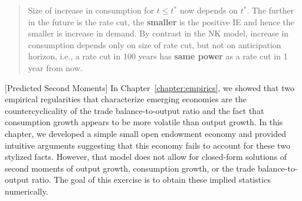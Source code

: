 \begin{exercise}
\begin{quote}
\begin{enumerate}
Size of increase in consumption for $t \le t^*$ now depends on $t^*$. The further in the future is the rate cut, the {\bf smaller} is the positive IE and hence the smaller is increase in demand. By contrast in the NK model, increase in consumption depends only on size of rate cut, but not on anticipation horizon, i.e., a rate cut in 100 years has {\bf same power} as a rate cut in 1 year from now.

\end{enumerate}
\end{quote}
\end{exercise}

\begin{exercise}  \label{exercise:endowment_psm}
[Predicted Second Moments] In Chapter~\ref{chapter:empirics}, we showed that  two empirical regularities that characterize emerging economies are the countercyclicality of the trade balance-to-output ratio and the fact that consumption growth appears to be more volatile than output growth. In this chapter, we developed a simple  
 small open endowment economy and provided intuitive arguments suggesting that this economy fails to account for these two stylized facts. However, that model does not allow for closed-form solutions of second moments of output growth, consumption growth, or the trade balance-to-output ratio. 
The goal of this exercise is to obtain these implied statistics numerically. 


\end{exercise}
